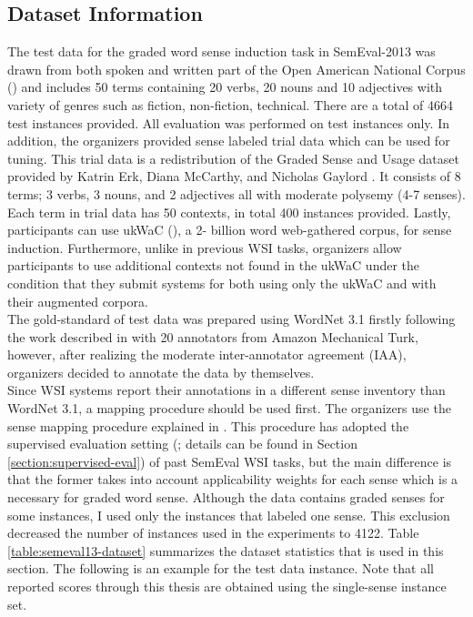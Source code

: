 
\subsection{Dataset Information} 


The test data for the graded word sense induction task in SemEval-2013 was drawn from both spoken and written part of the Open American National Corpus (\cite{ide2004openamerican}) and includes 50 terms containing 20 verbs, 20 nouns and 10 adjectives with variety of genres such as fiction, non-fiction, technical. There are a total of 4664 test instances provided. All evaluation was performed on test instances only. In addition, the organizers provided sense labeled trial data which can be used for tuning. This trial data is a redistribution of the Graded Sense and Usage dataset provided by Katrin Erk, Diana McCarthy, and Nicholas Gaylord \cite{erk09graded}. It consists of 8 terms; 3 verbs, 3 nouns, and 2 adjectives all with moderate polysemy (4-7 senses). Each term in trial data has 50 contexts, in total 400 instances provided. Lastly, participants can use ukWaC (\cite{ukWaC}), a 2- billion word web-gathered corpus, for sense induction. Furthermore, unlike in previous WSI tasks, organizers allow participants to use additional contexts not found in the ukWaC under the condition that they submit systems for both using only the ukWaC and with their augmented corpora. \\ 

The gold-standard of test data was prepared using WordNet 3.1 firstly following the work described in \cite{jurgens13embracing} with 20 annotators from Amazon Mechanical Turk, however, after realizing the moderate inter-annotator agreement (IAA), organizers decided to annotate the data by themselves. \\ 

Since WSI systems report their annotations in a different sense inventory than WordNet 3.1, a mapping procedure should be used first. The organizers use the sense mapping procedure explained in \cite{jurgens12evaluation}. This procedure has adopted the supervised evaluation setting  (\cite{agirre06evaluating}; details can be found in Section \ref{section:supervised-eval}) of past SemEval WSI tasks, but the main difference is that the former takes into account applicability weights for each sense which is a necessary for graded word sense. Although the data contains graded senses for some instances, I used only the instances that labeled one sense. This exclusion decreased the number of instances used in the experiments to 4122. Table \ref{table:semeval13-dataset} summarizes the dataset statistics that is used in this section. The following is an example for the test data instance. Note that all reported scores through this thesis are obtained using the single-sense instance set.

